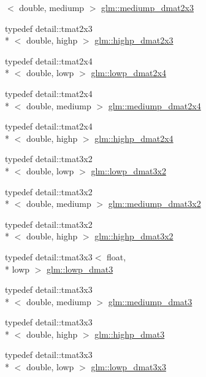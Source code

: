 \begin{DoxyCompactItemize}
$<$ double, mediump $>$ \hyperlink{group__core__precision_ga734e988edf759c7012c443014acb6674}{glm\-::mediump\-\_\-dmat2x3}
\item 
typedef detail\-::tmat2x3\\*
$<$ double, highp $>$ \hyperlink{group__core__precision_gafec7367665f006f2a7643103c5eddc38}{glm\-::highp\-\_\-dmat2x3}
\item 
typedef detail\-::tmat2x4\\*
$<$ double, lowp $>$ \hyperlink{group__core__precision_gac2285cef559b0dc35cb9a7f22e6a2dd8}{glm\-::lowp\-\_\-dmat2x4}
\item 
typedef detail\-::tmat2x4\\*
$<$ double, mediump $>$ \hyperlink{group__core__precision_gadb60bf60ef2b8da4a28a372b2bcca3a3}{glm\-::mediump\-\_\-dmat2x4}
\item 
typedef detail\-::tmat2x4\\*
$<$ double, highp $>$ \hyperlink{group__core__precision_gacd51d8188f7d66a83c035b8c4cd69f2d}{glm\-::highp\-\_\-dmat2x4}
\item 
typedef detail\-::tmat3x2\\*
$<$ double, lowp $>$ \hyperlink{group__core__precision_ga678c21e4fadeda255cfb146d40844bdd}{glm\-::lowp\-\_\-dmat3x2}
\item 
typedef detail\-::tmat3x2\\*
$<$ double, mediump $>$ \hyperlink{group__core__precision_gaff0060984716bcda68ff69ed27536bf6}{glm\-::mediump\-\_\-dmat3x2}
\item 
typedef detail\-::tmat3x2\\*
$<$ double, highp $>$ \hyperlink{group__core__precision_gac956fe6b946f0ccee78367ccd5427351}{glm\-::highp\-\_\-dmat3x2}
\item 
typedef detail\-::tmat3x3$<$ float, \\*
lowp $>$ \hyperlink{group__core__precision_ga07d9423bdde2d7ff880d6ece01dc9e32}{glm\-::lowp\-\_\-dmat3}
\item 
typedef detail\-::tmat3x3\\*
$<$ double, mediump $>$ \hyperlink{group__core__precision_ga80600af2c1ca11ead6123777185c372d}{glm\-::mediump\-\_\-dmat3}
\item 
typedef detail\-::tmat3x3\\*
$<$ double, highp $>$ \hyperlink{group__core__precision_ga993461e1d2caf19abd4f64d02ccdafa9}{glm\-::highp\-\_\-dmat3}
\item 
typedef detail\-::tmat3x3\\*
$<$ double, lowp $>$ \hyperlink{group__core__precision_gaea1bc4ede38e1b904f01ff5ce59210ea}{glm\-::lowp\-\_\-dmat3x3}

\end{DoxyCompactItemize}
